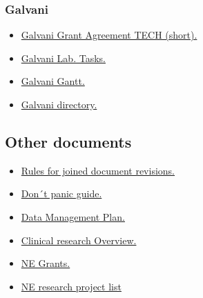 \subsubsection{Galvani}
\begin{itemize}
\item \href{https://www.dropbox.com/home/999%20-%20galvani-lab.eu%20repository/01%20-%20Galvani%20Basic%20Starter%20Kit?preview=Galvani+Tech+Proposal+855109--SEALED-PROPOSAL+short.pdf}{Galvani Grant Agreement TECH (short).}
    \item \href{https://docs.google.com/document/d/18_DfI75pC1e6bMpWSiBY7LVz0cBSdLIWyHygTgJ6p3w/edit}{Galvani Lab. Tasks.}
    \item \href{https://docs.google.com/spreadsheets/d/14srwfkr06nShSOCOmbv2nUXXlONLYjd6/edit?rtpof=true#gid=1839498795}{Galvani Gantt.}
     \item \href{https://docs.google.com/spreadsheets/d/1hmYrOKPDdvS4GNvrOgNENP8p-WfLTDdvGxLtxY_3WpU/edit#gid=0}{Galvani directory.}
\end{itemize}

\subsection{Other documents}
\begin{itemize}
   \item \href{https://docs.google.com/document/d/1TGVl9pppeMySwDjRnmjSmvmIVzkaIl4oBJjY9_VCWMU/edit?usp=sharing}{Rules for joined document revisions.}
   \item \href{https://docs.google.com/document/d/1k3vi7rj7HX7gRnTSQ9_zHMdyylKWJEN0YF3pZPfBDv0/edit}{Don´t panic guide.}
  \item \href{https://docs.google.com/document/d/1pyfM1j0SD_pPCVkUv2lWP6-E2Cya8ucYQ6GsUHYTrDE/edit#heading=h.axrlnzwlxave}{Data Management Plan.} 
  \item \href{https://docs.google.com/spreadsheets/d/10FZQ_QXZLdQijgOvBLNV6e2u1zObHv1MfcH_tUQ954g/edit#gid=1824133226}{Clinical research Overview.}
  \item \href{https://docs.google.com/spreadsheets/d/1-9uVHSc9v8hJlkRH3YDWJ-7bG6dIIWNw1KTHn9ufva4/edit#gid=2120321454}{NE Grants.}
  \item \href{https://docs.google.com/spreadsheets/d/181xnkBHL-Oe6InU_A1kzRPJXk24cG3IVgs6_l0440BA/edit#gid=0}{NE research project list}
\end{itemize}